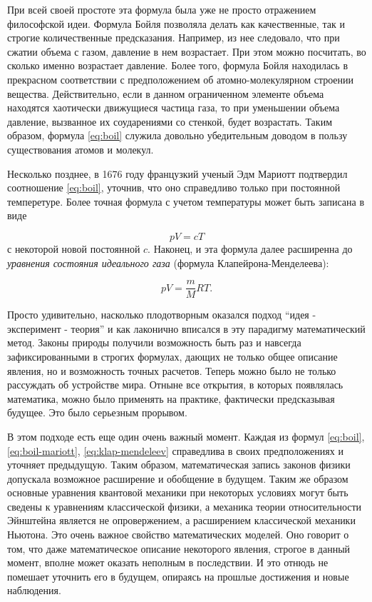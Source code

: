 При всей своей простоте эта формула была уже не просто отражением философской идеи.
Формула Бойля позволяла делать как качественные, так и строгие количественные предсказания.
Например, из нее следовало, что при сжатии объема с газом, давление в нем возрастает.
При этом можно посчитать, во сколько именно возрастает давление.
Более того, формула Бойля находилась в прекрасном соответствии с предположением об атомно-молекулярном строении вещества.
Действительно, если в данном ограниченном элементе объема находятся хаотически движущиеся частица газа, то при уменьшении объема давление, вызванное их соударениями со стенкой, будет возрастать.
Таким образом, формула \ref{eq:boil} служила довольно убедительным доводом в пользу существования атомов и молекул.  

Несколько позднее, в 1676 году французкий ученый Эдм Мариотт подтвердил соотношение \ref{eq:boil}, уточнив, что оно справедливо только при постоянной темперетуре.
Более точная формула с учетом температуры может быть записана в виде

\begin{equation}\label{eq:boil-mariott}
pV = cT
\end{equation}
с некоторой новой постоянной $c$. Наконец, и эта формула далее расширенна до \textit{уравнения состояния идеального газа} (формула Клапейрона-Менделеева):

\begin{equation}\label{eq:klap-mendeleev}
pV = \frac{m}{M}RT.
\end{equation}

Просто удивительно, насколько плодотворным оказался подход ``идея - эксперимент - теория'' и как лаконично вписался в эту парадигму математический метод.
Законы природы получили возможность быть раз и навсегда зафиксированными в строгих формулах, дающих не только общее описание явления, но и возможность точных расчетов.
Теперь можно было не только рассуждать об устройстве мира.
Отныне все открытия, в которых появлялась математика, можно было применять на практике, фактически предсказывая будущее.
Это было серьезным прорывом.

В этом подходе есть еще один очень важный момент.
Каждая из формул \ref{eq:boil}, \ref{eq:boil-mariott}, \ref{eq:klap-mendeleev} справедлива в своих предположениях и уточняет предыдущую.
Таким образом, математическая запись законов физики допускала возможное расширение и обобщение в будущем.
Таким же образом основные уравнения квантовой механики при некоторых условиях могут быть сведены к уравнениям классической физики, а механика теории относительности Эйнштейна является не опровержением, а расширением классической механики Ньютона. 
Это очень важное свойство математических моделей.
Оно говорит о том, что даже математическое описание некоторого явления, строгое в данный момент, вполне может оказать неполным в последствии.
И это отнюдь не помешает уточнить его в будущем, опираясь на прошлые достижения и новые наблюдения.

